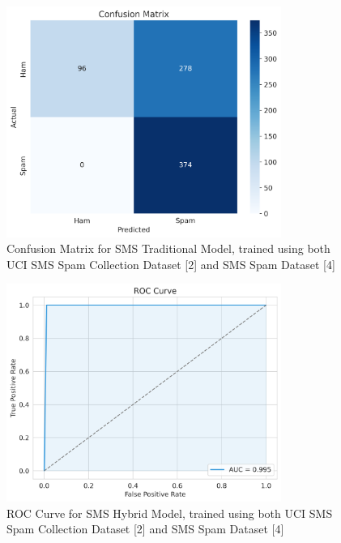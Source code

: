 \documentclass{article}
\begin{document}
\begin{figure}[htbp]
    \centering
    \includegraphics[width=0.8\textwidth]{../analysis/sms/traditional/confusion_matrix.png}
    \caption{Confusion Matrix for SMS Traditional Model, trained using both UCI SMS Spam Collection Dataset [2] and SMS Spam Dataset [4]}
    \label{fig:confusion_matrix_6}
\end{figure}

\begin{figure}[htbp]
    \centering
    \includegraphics[width=0.8\textwidth]{../analysis/sms/hybrid/roc_curve.png}
    \caption{ROC Curve for SMS Hybrid Model, trained using both UCI SMS Spam Collection Dataset [2] and SMS Spam Dataset [4]}
    \label{fig:roc_curve_7}
\end{figure}
\end{document}
